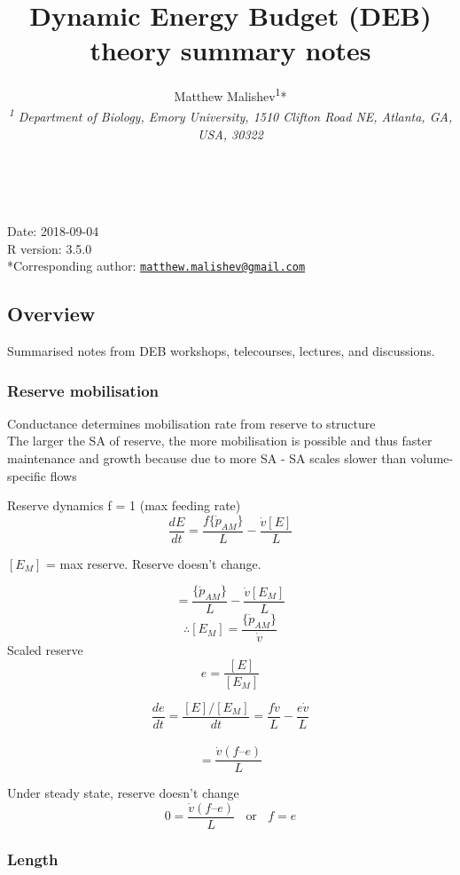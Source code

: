 \documentclass[10,portrait]{article}
\title{Dynamic Energy Budget (DEB) theory summary notes}
\author{Matthew
Malishev\textsuperscript{1}*\\[2\baselineskip]\emph{\textsuperscript{1}
Department of Biology, Emory University, 1510 Clifton Road NE, Atlanta,
GA, USA, 30322}}
\date{}
\begin{document}
\maketitle

{
\hypersetup{linkcolor=black}
\setcounter{tocdepth}{4}
\tableofcontents
}
~

Date: 2018-09-04\\
R version: 3.5.0\\
*Corresponding author:
\href{mailto:matthew.malishev@gmail.com}{\nolinkurl{matthew.malishev@gmail.com}}

\newpage  

\subsection{Overview}\label{overview}

Summarised notes from DEB workshops, telecourses, lectures, and
discussions.

\subsubsection{Reserve mobilisation}\label{reserve-mobilisation}

Conductance determines mobilisation rate from reserve to structure\\
The larger the SA of reserve, the more mobilisation is possible and thus
faster maintenance and growth because due to more SA - SA scales slower
than volume-specific flows

Reserve dynamics f = 1 (max feeding rate)\\
\[
\frac
  {d E}
  {d t}  
  = \frac
  {f\{\dot{p}_{AM}\}}
  {L}  
  - \frac  
  {\dot{v}[E]}  
  {L}   
\]

\([E_{M}]\) = max reserve. Reserve doesn't change.

\[
= \frac
  {\{\dot{p}_{AM}\}}
  {L} - 
  \frac
  {\dot{v}[E_{M}]}
  {L}    
\] \[
\therefore 
[E_{M}]
= \frac
  {\{\dot{p}_{AM}\}}
  {\dot{v}}
\] Scaled reserve \[
e =
\frac
{[E]}
{[E_{M}]}  
\]

\[
\frac
{de}
{dt}
= \frac
{[E] /[E_{M}]}
{dt} 
= \frac
{f\dot{v}}
{L}  - 
\frac
{e\dot{v}}
{L}     
\]\\
\[
= \frac
{\dot{v} (f – e)}
{L} 
\]

Under steady state, reserve doesn't change\\
\[
0 =
\frac
{\dot{v} (f – e)}
{L}
\ \ \ \
\text{or}
\ \ \ \ f = e
\]

\subsubsection{Length}\label{length}
\end{document}
